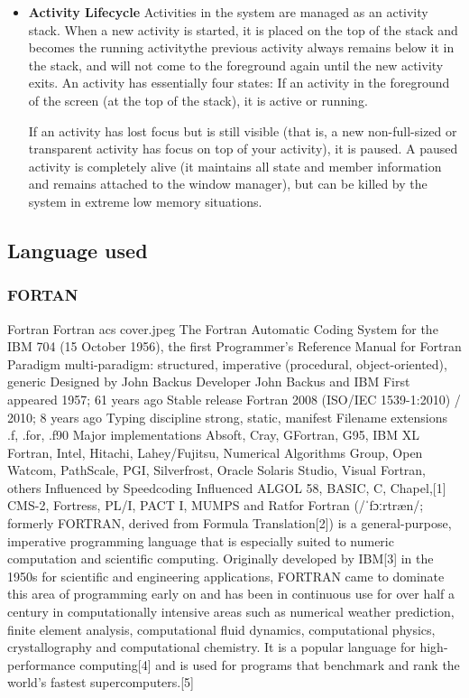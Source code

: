 \begin{itemize}

\item \textbf{Activity Lifecycle}
Activities in the system are managed as an activity stack. When a new activity
is started, it is placed on the top of the stack and becomes the running activitythe previous activity always remains below it in the stack, and will not come to
the foreground again until the new activity exits. An activity has essentially four
states:
If an activity in the foreground of the screen (at the top of the stack), it is
active or running.

If an activity has lost focus but is still visible (that is, a new non-full-sized or
transparent activity has focus on top of your activity), it is paused. A paused
activity is completely alive (it maintains all state and member information and
remains attached to the window manager), but can be killed by the system in
extreme low memory situations.


\end{itemize}

\subsection{Language used}
\subsubsection{FORTAN}

Fortran
Fortran acs cover.jpeg
The Fortran Automatic Coding System for the IBM 704 (15 October 1956), the first Programmer's Reference Manual for Fortran
Paradigm	multi-paradigm: structured, imperative (procedural, object-oriented), generic
Designed by	John Backus
Developer	John Backus and IBM
First appeared	1957; 61 years ago
Stable release	
Fortran 2008 (ISO/IEC 1539-1:2010) / 2010; 8 years ago
Typing discipline	strong, static, manifest
Filename extensions	.f, .for, .f90
Major implementations
Absoft, Cray, GFortran, G95, IBM XL Fortran, Intel, Hitachi, Lahey/Fujitsu, Numerical Algorithms Group, Open Watcom, PathScale, PGI, Silverfrost, Oracle Solaris Studio, Visual Fortran, others
Influenced by
Speedcoding
Influenced
ALGOL 58, BASIC, C, Chapel,[1] CMS-2, Fortress, PL/I, PACT I, MUMPS and Ratfor
Fortran (/ˈfɔːrtræn/; formerly FORTRAN, derived from Formula Translation[2]) is a general-purpose, imperative programming language that is especially suited to numeric computation and scientific computing. Originally developed by IBM[3] in the 1950s for scientific and engineering applications, FORTRAN came to dominate this area of programming early on and has been in continuous use for over half a century in computationally intensive areas such as numerical weather prediction, finite element analysis, computational fluid dynamics, computational physics, crystallography and computational chemistry. It is a popular language for high-performance computing[4] and is used for programs that benchmark and rank the world's fastest supercomputers.[5]

